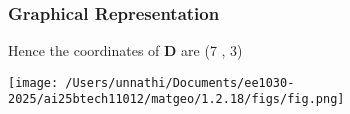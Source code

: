 \documentclass{beamer}
\begin{document}
\begin{frame}
\frametitle{Graphical Representation}
Hence the coordinates of \textbf{D} are (7 , 3)
\begin{center}
\texttt{[image: /Users/unnathi/Documents/ee1030-2025/ai25btech11012/matgeo/1.2.18/figs/fig.png]}
\end{center}
\end{frame}
\end{document}
